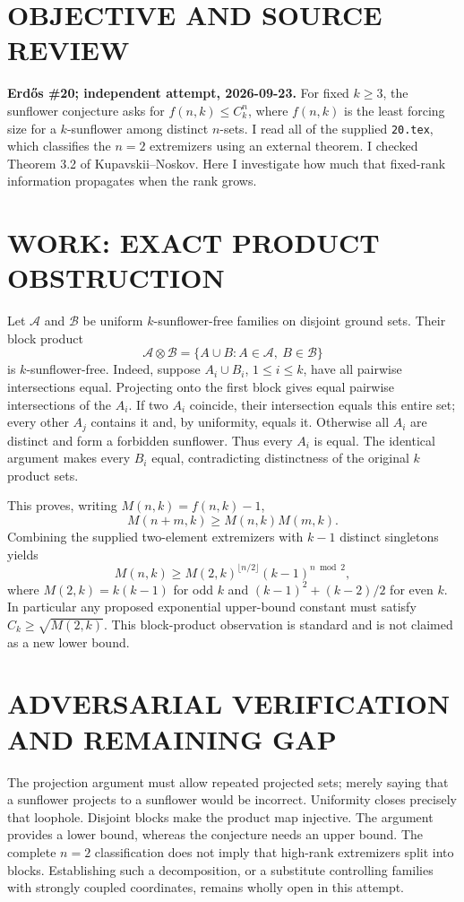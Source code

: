 \section{OBJECTIVE AND SOURCE REVIEW}
\textbf{Erd\H{o}s \#20; independent attempt, 2026-09-23.}
For fixed $k\ge3$, the sunflower conjecture asks for $f(n,k)\le C_k^n$, where $f(n,k)$ is the least forcing size for a $k$-sunflower among distinct $n$-sets. I read all of the supplied \texttt{20.tex}, which classifies the $n=2$ extremizers using an external theorem. I checked Theorem 3.2 of Kupavskii--Noskov. Here I investigate how much that fixed-rank information propagates when the rank grows.

\section{WORK: EXACT PRODUCT OBSTRUCTION}
Let $\mathcal A$ and $\mathcal B$ be uniform $k$-sunflower-free families on disjoint ground sets. Their block product
\[
\mathcal A\otimes\mathcal B=\{A\cup B:A\in\mathcal A,\ B\in\mathcal B\}
\]
is $k$-sunflower-free. Indeed, suppose $A_i\cup B_i$, $1\le i\le k$, have all pairwise intersections equal. Projecting onto the first block gives equal pairwise intersections of the $A_i$. If two $A_i$ coincide, their intersection equals this entire set; every other $A_j$ contains it and, by uniformity, equals it. Otherwise all $A_i$ are distinct and form a forbidden sunflower. Thus every $A_i$ is equal. The identical argument makes every $B_i$ equal, contradicting distinctness of the original $k$ product sets.

This proves, writing $M(n,k)=f(n,k)-1$,
\[
M(n+m,k)\ge M(n,k)M(m,k).
\]
Combining the supplied two-element extremizers with $k-1$ distinct singletons yields
\[
M(n,k)\ge M(2,k)^{\lfloor n/2\rfloor}(k-1)^{n\bmod2},
\]
where $M(2,k)=k(k-1)$ for odd $k$ and $(k-1)^2+(k-2)/2$ for even $k$. In particular any proposed exponential upper-bound constant must satisfy $C_k\ge\sqrt{M(2,k)}$. This block-product observation is standard and is not claimed as a new lower bound.

\section{ADVERSARIAL VERIFICATION AND REMAINING GAP}
The projection argument must allow repeated projected sets; merely saying that a sunflower projects to a sunflower would be incorrect. Uniformity closes precisely that loophole. Disjoint blocks make the product map injective. The argument provides a lower bound, whereas the conjecture needs an upper bound. The complete $n=2$ classification does not imply that high-rank extremizers split into blocks. Establishing such a decomposition, or a substitute controlling families with strongly coupled coordinates, remains wholly open in this attempt.

